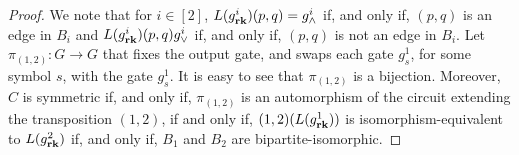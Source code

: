 \documentclass[../paper.tex]{subfiles}
\begin{document}
\begin{proof}
  We note that for $i \in [2]$, $L(g^i_{\text{\textbf{rk}}})(p,q)= g^i_\land$ if, and only
  if, $(p,q)$ is an edge in $B_i$ and $L(g^i_{\text{\textbf{rk}}})(p,q) g^i_\lor$ if, and
  only if, $(p,q)$ is not an edge in $B_i$. Let $\pi_{(1,2)} : G \rightarrow G$
  that fixes the output gate, and swaps each gate $g^1_s$, for some symbol $s$,
  with the gate $g^1_s$. It is easy to see that $\pi_{(1,2)}$ is a bijection.
  Moreover, $C$ is symmetric if, and only if, $\pi_{(1,2)}$ is an automorphism
  of the circuit extending the transposition $(1,2)$, if and only if, $(1,2)
  (L(g^1_{\text{\textbf{rk}}}))$ is isomorphism-equivalent to $L(g^2_{\text{\textbf{rk}}})$ if, and only
  if, $B_1$ and $B_2$ are bipartite-isomorphic.
  


\end{proof}
\end{document}
